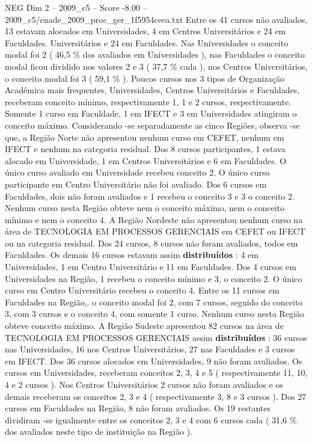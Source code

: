 \begin{textsample}{NEG Dim 2 – 2009\_c5 – Score -8.00 – 2009\_c5/enade\_2009\_proc\_ger\_1f5954ceea.txt}
Entre os 41 cursos não avaliados, 13 estavam alocados em Universidades, 4 em Centros Universitários e 24 em Faculdades.
Universitários e 24 em Faculdades.
Nas Universidades o conceito modal foi 2 ( 46,5 \% dos avaliados em Universidades ), nas Faculdades o conceito modal ficou dividido nos valores 2 e 3 ( 37,7 \% cada ), nos Centros Universitários, o conceito modal foi 3 ( 59,1 \% ).
Poucos cursos nos 3 tipos de Organização Acadêmica mais frequentes, Universidades, Centros Universitários e Faculdades, receberam conceito mínimo, respectivamente 1, 1 e 2 cursos, respectivamente.
Somente 1 curso em Faculdade, 1 em IFECT e 3 em Universidades atingiram o conceito máximo.
Considerando -se separadamente as cinco Regiões, observa -se que, a Região Norte não apresentou nenhum curso em CEFET, nenhum em IFECT e nenhum na categoria residual.
Dos 8 cursos participantes, 1 estava alocado em Universidade, 1 em Centros Universitários e 6 em Faculdades.
O único curso avaliado em Universidade recebeu conceito 2.
O único curso participante em Centro Universitário não foi avaliado.
Dos 6 cursos em Faculdades, dois não foram avaliados e 1 recebeu o conceito 3 e 3 o conceito 2.
Nenhum curso nesta Região obteve nem o conceito máximo, nem o conceito mínimo e nem o conceito 4.
A Região Nordeste não apresentou nenhum curso na área de TECNOLOGIA EM PROCESSOS GERENCIAIS em CEFET ou IFECT ou na categoria residual.
Dos 24 cursos, 8 cursos não foram avaliados, todos em Faculdades.
Os demais 16 cursos estavam assim \textbf{distribuídos} : 4 em Universidades, 1 em Centro Universitário e 11 em Faculdades.
Dos 4 cursos em Universidades na Região, 1 recebeu o conceito mínimo e 3, o conceito 2.
O único curso em Centro Universitário recebeu o conceito 4.
Entre os 11 cursos em Faculdades na Região,. o conceito modal foi 2, com 7 cursos, seguido do conceito 3, com 3 cursos e o conceito 4, com somente 1 curso.
Nenhum curso nesta Região obteve conceito máximo.
A Região Sudeste apresentou 82 cursos na área de TECNOLOGIA EM PROCESSOS GERENCIAIS assim \textbf{distribuídos} : 36 cursos nas Universidades, 16 nos Centros Universitários, 27 nas Faculdades e 3 cursos em IFECT.
Dos 36 cursos alocados em Universidades, 9 não foram avaliados.
Os cursos em Universidades, receberam conceitos 2, 3, 4 e 5 ( respectivamente 11, 10, 4 e 2 cursos ).
Nos Centros Universitários 2 cursos não foram avaliados e os demais receberam os conceitos 2, 3 e 4 ( respectivamente 3, 8 e 3 cursos ).
Dos 27 cursos em Faculdades na Região, 8 não foram avaliados.
Os 19 restantes dividiram -se igualmente entre os conceitos 2, 3 e 4 com 6 cursos cada ( 31,6 \% dos avaliados neste tipo de instituição na Região ).

\end{textsample}
